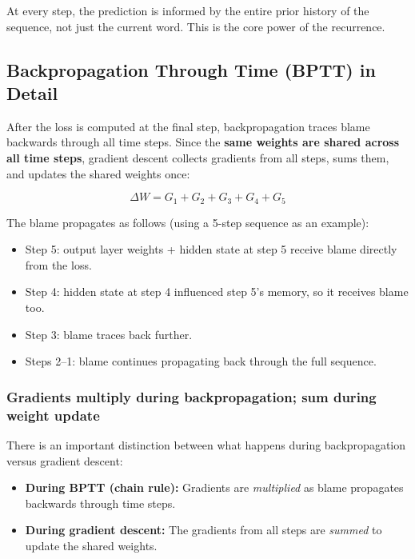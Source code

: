 \documentclass[12pt,a4paper]{article}
\begin{document}
At every step, the prediction is informed by the entire prior history of the sequence,
not just the current word. This is the core power of the recurrence.

\subsection{Backpropagation Through Time (BPTT) in Detail}

After the loss is computed at the final step, backpropagation traces blame backwards
through all time steps. Since the \textbf{same weights are shared across all time steps},
gradient descent collects gradients from all steps, sums them, and updates the shared
weights once:

\[
\Delta W = G_1 + G_2 + G_3 + G_4 + G_5
\]

The blame propagates as follows (using a 5-step sequence as an example):
\begin{itemize}
    \item Step 5: output layer weights + hidden state at step 5 receive blame directly
          from the loss.
    \item Step 4: hidden state at step 4 influenced step 5's memory, so it receives blame
          too.
    \item Step 3: blame traces back further.
    \item Steps 2--1: blame continues propagating back through the full sequence.
\end{itemize}

\subsubsection{Gradients multiply during backpropagation; sum during weight update}

There is an important distinction between what happens during backpropagation versus
gradient descent:

\begin{itemize}
    \item \textbf{During BPTT (chain rule):} Gradients are \textit{multiplied} as blame
          propagates backwards through time steps.
    \item \textbf{During gradient descent:} The gradients from all steps are
          \textit{summed} to update the shared weights.
\end{itemize}
\end{document}
